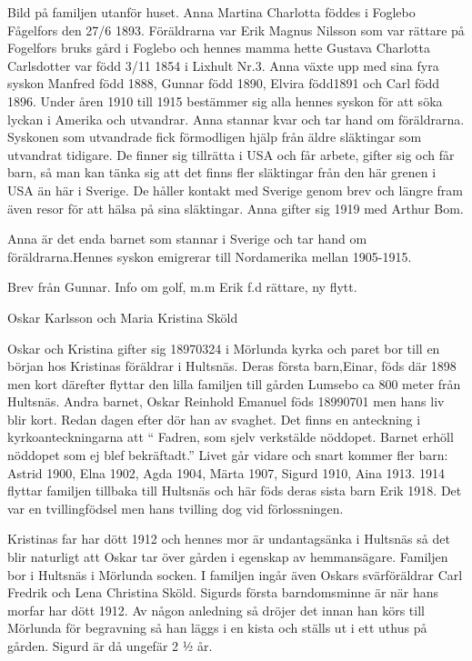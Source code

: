 Bild på familjen utanför huset.
Anna Martina Charlotta föddes i Foglebo Fågelfors den 27/6 1893. Föräldrarna var Erik Magnus Nilsson som var rättare på Fogelfors bruks gård i Foglebo och hennes mamma hette Gustava Charlotta Carlsdotter var född 3/11 1854 i Lixhult Nr.3.
Anna växte upp med sina fyra syskon Manfred född 1888, Gunnar född 1890, Elvira född1891 och Carl född 1896. 
Under åren 1910 till 1915 bestämmer sig alla hennes syskon för att söka lyckan i Amerika och utvandrar. Anna stannar kvar och tar hand om föräldrarna. Syskonen som utvandrade fick förmodligen hjälp från äldre släktingar som utvandrat tidigare. De finner sig tillrätta i USA och får arbete, gifter sig och får barn, så man kan tänka sig att det finns fler släktingar från den här grenen i USA än här i Sverige.
De håller kontakt med Sverige genom brev och längre fram även resor för att hälsa på sina släktingar.
Anna gifter sig 1919 med Arthur Bom.




Anna är det enda barnet som stannar i Sverige och tar hand om föräldrarna.Hennes syskon emigrerar till Nordamerika mellan 1905-1915. 


Brev från Gunnar. Info om golf, m.m
Erik f.d rättare, ny flytt.




Oskar Karlsson och Maria Kristina Sköld


Oskar och Kristina gifter sig 18970324 i Mörlunda kyrka och paret bor till en början hos Kristinas föräldrar i Hultsnäs. Deras första barn,Einar, föds där 1898 men kort därefter flyttar den lilla familjen till gården Lumsebo ca 800 meter från Hultsnäs. Andra barnet, Oskar Reinhold Emanuel föds 18990701 men hans liv blir kort. Redan dagen efter dör han av svaghet. Det finns en anteckning i kyrkoanteckningarna att “ Fadren, som sjelv verkstälde nöddopet. Barnet erhöll nöddopet som ej blef bekräftadt.”
Livet går vidare och snart kommer fler barn: Astrid 1900, Elna 1902, Agda 1904, Märta 1907, Sigurd 1910, Aina 1913.
1914 flyttar familjen tillbaka till Hultsnäs och här föds deras sista barn Erik 1918. Det var en tvillingfödsel men hans tvilling dog vid förlossningen.


Kristinas far har dött 1912 och hennes mor är undantagsänka i Hultsnäs så det blir naturligt att Oskar tar över gården i egenskap av hemmansägare.
 Familjen bor i Hultsnäs i Mörlunda socken. I familjen ingår även Oskars svärföräldrar Carl Fredrik och Lena Christina Sköld. Sigurds första barndomsminne är när hans morfar har dött 1912. Av någon anledning så dröjer det innan han körs till Mörlunda för begravning så han läggs i en kista och ställs ut i ett uthus på gården. Sigurd är då ungefär 2 ½ år.


